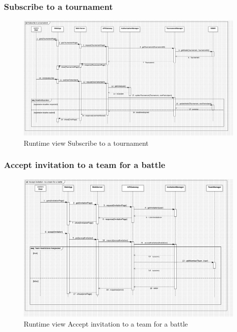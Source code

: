 \subsubsection*{Subscribe to a tournament}
\begin{figure}[H]
    \centering
    \includegraphics[width=\textwidth]{Diagrams/SubscribeTournamentSD.jpg}
    \caption{Runtime view Subscribe to a tournament}
    \label{fig:runtime_view_subscribe_tournament}
\end{figure}

\subsubsection*{Accept invitation to a team for a battle}
\begin{figure}[H]
    \centering
    \includegraphics[width=\textwidth]{Diagrams/AcceptInvitationSD.jpg}
    \caption{Runtime view Accept invitation to a team for a battle}
    \label{fig:runtime_view_accept_invitation}
\end{figure}
